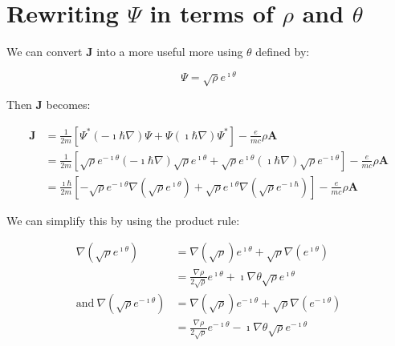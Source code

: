 
\section{Rewriting $\Psi$ in terms of $\rho$ and $\theta$}
\label{sec:rewriting}

We can convert $\mathbf{J}$ into a more useful more using $\theta$ defined by:

\begin{equation}
    \Psi = \sqrt{\rho} e^{\imath \theta}
\end{equation}

Then $\mathbf{J}$ becomes:

\begin{align}
    \mathbf{J} &= \frac{1}{2m} \left[ \Psi^* \left( -\imath \hbar \nabla \right)
    \Psi + \Psi \left( \imath \hbar \nabla \right) \Psi^* \right] - \frac{e}{mc}
    \rho \mathbf{A} \\
    &= \frac{1}{2m} \left[ \sqrt{\rho} e^{-\imath \theta} \left( -\imath \hbar
    \nabla \right) \sqrt{\rho} e^{\imath \theta} + \sqrt{\rho} e^{\imath \theta}
    \left( \imath \hbar \nabla \right) \sqrt{\rho} e^{-\imath \theta} \right] -
    \frac{e}{mc} \rho \mathbf{A} \\
    &= \frac{\imath \hbar}{2m} \left[ -\sqrt{\rho} e^{-\imath \theta} \nabla
    \left( \sqrt{\rho}e^{\imath \theta} \right) + \sqrt{\rho} e^{\imath \theta}
    \nabla \left( \sqrt{\rho} e^{-\imath \hbar} \right) \right] - \frac{e}{mc}
    \rho \mathbf{A}
\end{align}

We can simplify this by using the product rule:

\begin{align}
    \nabla \left( \sqrt{\rho} e^{\imath \theta} \right) &= \nabla \left(
    \sqrt{\rho} \right) e^{\imath \theta} + \sqrt{\rho} \nabla \left( e^{\imath
    \theta} \right) \\
    &= \frac{\nabla \rho}{2 \sqrt{\rho}} e^{\imath \theta} + \imath \nabla \theta \sqrt{\rho}
    e^{\imath \theta} \\
    \mathrm{and} ~ \nabla \left( \sqrt{\rho} e^{-\imath \theta} \right) &= \nabla
    \left( \sqrt{\rho} \right) e^{-\imath \theta} + \sqrt{\rho} \nabla \left(
    e^{-\imath \theta} \right) \\
    &= \frac{\nabla \rho}{2 \sqrt{\rho}} e^{-\imath \theta} - \imath \nabla \theta
    \sqrt{\rho} e^{-\imath \theta}
\end{align}

